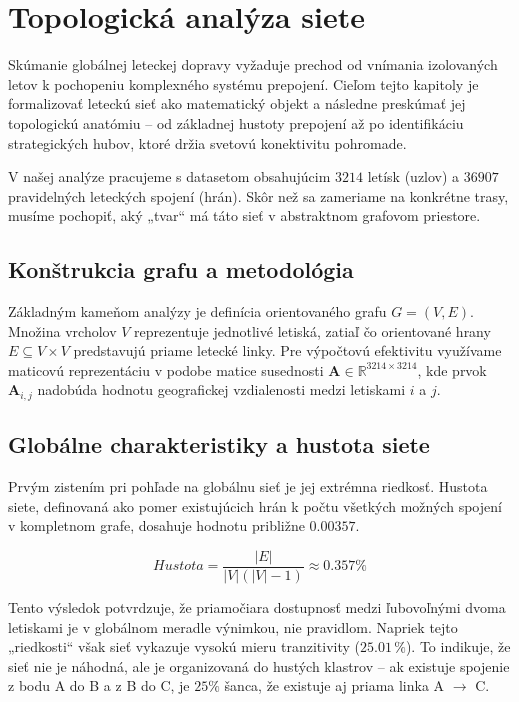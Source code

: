\chapter[Topologická analýza siete \small{(Jakub Novotný)}]{Topologická analýza siete}
Skúmanie globálnej leteckej dopravy vyžaduje prechod od vnímania izolovaných letov k pochopeniu komplexného systému prepojení.
Cieľom tejto kapitoly je formalizovať leteckú sieť ako matematický objekt a následne preskúmať jej topologickú anatómiu – od základnej hustoty
prepojení až po identifikáciu strategických hubov, ktoré držia svetovú konektivitu pohromade.

V našej analýze pracujeme s datasetom obsahujúcim $3214$ letísk (uzlov) a $36907$ pravidelných leteckých spojení (hrán). Skôr než sa zameriame
na konkrétne trasy, musíme pochopiť, aký „tvar“ má táto sieť v abstraktnom grafovom priestore.

\section*{Konštrukcia grafu a metodológia}
Základným kameňom analýzy je definícia orientovaného grafu $G = (V, E)$. Množina vrcholov $V$ reprezentuje jednotlivé letiská, zatiaľ čo orientované
hrany $E \subseteq V \times V$ predstavujú priame letecké linky. Pre výpočtovú efektivitu využívame maticovú reprezentáciu v podobe matice susednosti
$\mathbf{A} \in \mathbb{R}^{3214 \times 3214}$, kde prvok $\mathbf{A}_{i,j}$ nadobúda hodnotu geografickej vzdialenosti medzi letiskami $i$ a $j$.

\section{Globálne charakteristiky a hustota siete}
Prvým zistením pri pohľade na globálnu sieť je jej extrémna riedkosť. Hustota siete, definovaná ako pomer existujúcich hrán k počtu
všetkých možných spojení v kompletnom grafe, dosahuje hodnotu približne $0.00357$.

\begin{equation}
    Hustota = \frac{|E|}{|V|(|V|-1)} \approx 0.357 \%
\end{equation}

Tento výsledok potvrdzuje, že priamočiara dostupnosť medzi ľubovoľnými dvoma letiskami je v globálnom meradle výnimkou, nie pravidlom. Napriek tejto
„riedkosti“ však sieť vykazuje vysokú mieru tranzitivity ($25.01\,\%$). To indikuje, že sieť nie je náhodná, ale je organizovaná do hustých klastrov
– ak existuje spojenie z bodu A do B a z B do C, je $25\%$ šanca, že existuje aj priama linka A $\rightarrow$ C.

